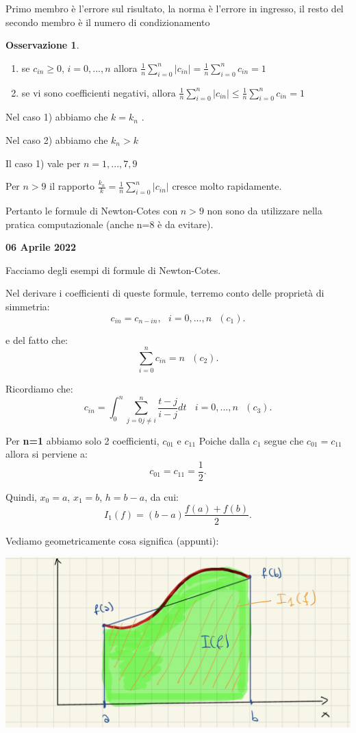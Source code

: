 \documentclass[11pt]{article}
\theoremstyle{definition}
\newtheorem{oss}{Osservazione}
\theoremstyle{plain}
\begin{document}
Primo membro è l'errore sul risultato, la norma è l'errore in ingresso, il resto del secondo membro è il numero di condizionamento

\begin{oss}
	\begin{enumerate}
		\item se $c_{in}\ge 0$, $i=0,...,n$ allora $\frac{1}{n}\sum_{i=0}^{n} |c_{in}|=\frac{1}{n}\sum_{i=0}^{n} c_{in}=1$ 
		\item se vi sono coefficienti negativi, allora $\frac{1}{n}\sum_{i=0}^{n} |c_{in}|\le \frac{1}{n}\sum_{i=0}^{n} c_{in}=1$
	\end{enumerate}

	Nel caso 1) abbiamo che $k=k_n$ .

	Nel caso 2) abbiamo che $k_n>k$ 

	Il caso 1) vale per $n=1,...,7,9$ 

	Per $n>9$ il rapporto $\frac{k_n}{k}=\frac{1}{n}\sum_{i=0}^{n}|c_{in}| $ cresce molto rapidamente.
\end{oss}

Pertanto le formule di Newton-Cotes con $n>9$ non sono da utilizzare nella pratica computazionale (anche n=8 è da evitare).


\begin{center}
{\LARGE \bf 06 Aprile 2022}\\
\end{center}

Facciamo degli esempi di formule di Newton-Cotes.

Nel derivare i coefficienti di queste formule, terremo conto delle proprietà di simmetria:
\[
	c_{in}=c_{n-in},\ \ \ i=0,...,n\ \ \ (c_1)
.\] 

e del fatto che:
\[
	\sum_{i=0}^{n} c_{in}=n\ \ \ (c_2)
.\] 

Ricordiamo che:
\[
	c_{in}=\int_{0}^{n}\sum_{j=0 j\neq i}^{n} \frac{t-j}{i-j}dt\ \ \ \ i=0,...,n\ \ \ (c_3)
.\] 

Per \textbf{n=1} abbiamo solo 2 coefficienti, $c_{01}$ e $c_{11}$ Poiche dalla $c_1$  segue che $c_{01}=c_{11}$ allora si perviene a:
\[
c_{01}=c_{11}=\frac{1}{2}
.\] 

Quindi, $x_0=a$, $x_1=b$, $h=b-a$, da cui:
\[
	I_1(f)=(b-a)\frac{f(a)+f(b)}{2}
.\] 

Vediamo geometricamente cosa significa (appunti):

\includegraphics[width=\textwidth]{formula_trapezio}
\end{document}
